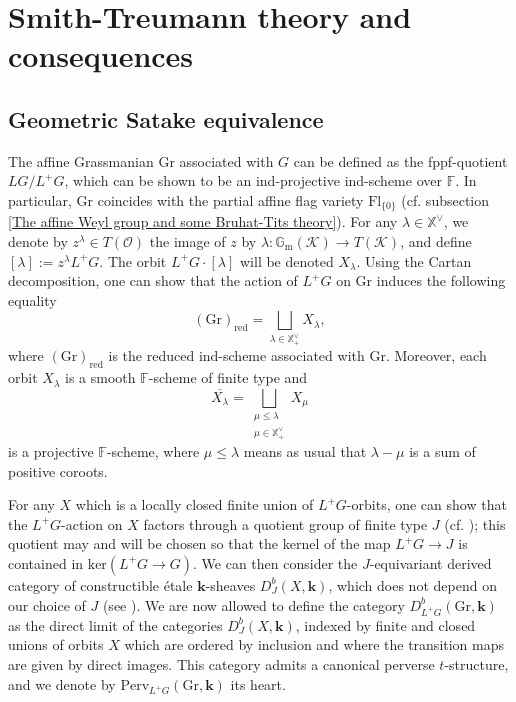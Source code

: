 \documentclass[11pt]{amsart}
\theoremstyle{plain}
\theoremstyle{remark}
\numberwithin{equation}{section}
\begin{document}
	\section{Smith-Treumann theory and consequences}\label{smith section}
	\subsection{Geometric Satake equivalence}\label{geosat}
	The affine Grassmanian $\mathrm{Gr}$ associated with $G$ can be defined as the fppf-quotient $LG/L^+G$, which can be shown to be an ind-projective ind-scheme over $\mathbb{F}$. In particular, $\mathrm{Gr}$ coincides with the partial affine flag variety $\mathrm{Fl}_{\{0\}}$ (cf. subsection \ref{The affine Weyl group and some Bruhat-Tits theory}). For any $\lambda\in\mathbb{X}^\vee$, we denote by $z^\lambda\in T(\mathcal{O})$ the image of $z$ by $\lambda:\mathbb{G}_\mathrm{m}(\mathcal{K})\to T(\mathcal{K})$, and define $[\lambda]:=z^\lambda L^+G$. The orbit $L^+G\cdot [\lambda]$ will be denoted $X_\lambda$. Using the Cartan decomposition, one can show that the action of $L^+G$ on $\mathrm{Gr}$ induces the following equality
	$$(\mathrm{Gr})_{\mathrm{red}}=\bigsqcup_{\lambda\in \mathbb{X}^\vee_+}X_\lambda,$$
	where $(\mathrm{Gr})_{\mathrm{red}}$ is the reduced ind-scheme associated with $\mathrm{Gr}$. Moreover, each orbit $X_\lambda$ is a smooth $\mathbb{F}$-scheme of finite type and
	$$\overline{X_\lambda}=\bigsqcup_{\substack{\mu\leq\lambda\\\mu\in \mathbb{X}^\vee_+}}X_\mu$$
	is a projective $\mathbb{F}$-scheme, where $\mu\leq \lambda$ means as usual that $\lambda-\mu$ is a sum of positive coroots.
	
	For any $X$ which is a locally closed finite union of $L^+G$-orbits, one can show that the $L^+G$-action on $X$ factors through a quotient group of finite type $J$ (cf. \cite[Lemma 3.2]{ciappara2021hecke}); this quotient may and will be chosen so that the kernel of the map $L^+G\to J$ is contained in $\mathrm{ker}(L^+G\to G)$. We can then consider the $J$-equivariant derived category of constructible \'etale $\mathbf{k}$-sheaves $D^b_{J}(X,\mathbf{k})$, which does not depend on our choice of $J$ (see \cite[§3.3]{ciappara2021hecke}). We are now allowed to define the category $D^b_{L^+G}(\mathrm{Gr},\mathbf{k})$ as the direct limit of the categories $D^b_{J}(X,\mathbf{k})$, indexed by finite and closed unions of orbits $X$ which are ordered by inclusion and where the transition maps are given by direct images. This category admits a canonical perverse $t$-structure, and we denote by $\mathrm{Perv}_{L^+G}(\mathrm{Gr},\mathbf{k})$ its heart.  
	
\end{document}
